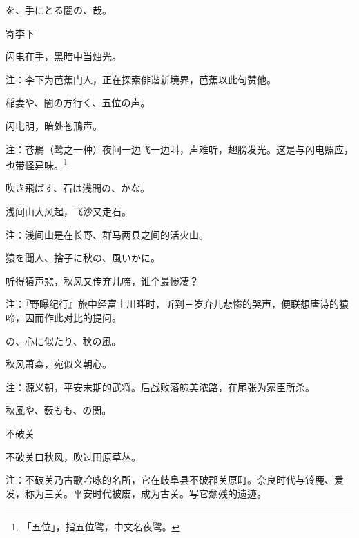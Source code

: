 \begin{haiku}
    {\FH {}を、手にとる闇の、哉。}

    {\FK 寄李下}

    {\FK 闪电在手，黑暗中当烛光。}

    {\FT 注：李下为芭蕉门人，正在探索俳谐新境界，芭蕉以此句赞他。}
\end{haiku}

\begin{haiku}
    {\FH 稲妻や、闇の方行く、五位の声。}

    {\FK 闪电明，暗处苍鳽声。}

    {\FT 注：苍鳽（鹭之一种）夜间一边飞一边叫，声难听，翅膀发光。这是与闪电照应，也带怪异味。\footnote{\FT 「五位」，指五位鹭，中文名夜鹭。}}
\end{haiku}

\begin{haiku}
    {\FH 吹き飛ばす、石は浅間の、かな。}

    {\FK 浅间山大风起，飞沙又走石。}

    {\FT 注：浅间山是在长野、群马两县之间的活火山。}
\end{haiku}

\begin{haiku}
    {\FH 猿を聞人、捨子に秋の、風いかに。}

    {\FK 听得猿声悲，秋风又传弃儿啼，谁个最惨凄？}

    {\FT 注：『野曝纪行』旅中经富士川畔时，听到三岁弃儿悲惨的哭声，便联想唐诗的猿啼，因而作此对比的提问。}
\end{haiku}

\begin{haiku}
    {\FH {}の、心に似たり、秋の風。}

    {\FK 秋风萧森，宛似义朝心。}

    {\FT 注：源义朝，平安末期的武将。后战败落魄美浓路，在尾张为家臣所杀。}
\end{haiku}

\begin{haiku}
    {\FH 秋風や、薮もも、の関。}

    {\FK 不破关}

    {\FK 不破关口秋风，吹过田原草丛。}

    {\FT 注：不破关乃古歌吟咏的名所，它在歧阜县不破郡关原町。奈良时代与铃鹿、爱发，称为三关。平安时代被废，成为古关。写它颓残的遗迹。}
\end{haiku}

